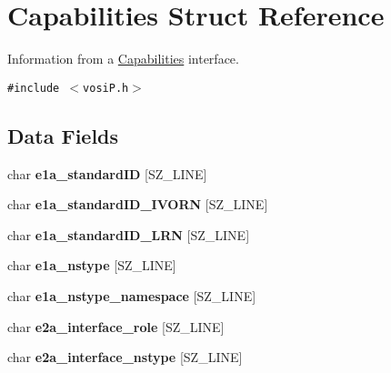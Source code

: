 \hypertarget{structCapabilities}{
\section{Capabilities Struct Reference}
\label{structCapabilities}
}
Information from a \hyperlink{structCapabilities}{Capabilities} interface.  


{\tt \#include $<$vosiP.h$>$}

\subsection*{Data Fields}
\begin{CompactItemize}
\item 
\hypertarget{structCapabilities_8020ae00bdbc48d12754fe04260e7fa1}{
char \textbf{e1a\_\-standardID} \mbox{[}SZ\_\-LINE\mbox{]}}
\label{structCapabilities_8020ae00bdbc48d12754fe04260e7fa1}

\item 
\hypertarget{structCapabilities_ec89e67e6f5cf39ddc6adf814b1dd86e}{
char \textbf{e1a\_\-standardID\_\-IVORN} \mbox{[}SZ\_\-LINE\mbox{]}}
\label{structCapabilities_ec89e67e6f5cf39ddc6adf814b1dd86e}

\item 
\hypertarget{structCapabilities_5908227b2abff053237f980a1f917365}{
char \textbf{e1a\_\-standardID\_\-LRN} \mbox{[}SZ\_\-LINE\mbox{]}}
\label{structCapabilities_5908227b2abff053237f980a1f917365}

\item 
\hypertarget{structCapabilities_1acd1c479ef5855845552039ca8f4a9b}{
char \textbf{e1a\_\-nstype} \mbox{[}SZ\_\-LINE\mbox{]}}
\label{structCapabilities_1acd1c479ef5855845552039ca8f4a9b}

\item 
\hypertarget{structCapabilities_30bd4ccaaf91344f78bb17f35069fe25}{
char \textbf{e1a\_\-nstype\_\-namespace} \mbox{[}SZ\_\-LINE\mbox{]}}
\label{structCapabilities_30bd4ccaaf91344f78bb17f35069fe25}

\item 
\hypertarget{structCapabilities_43765289c66fc7ef70dd662011c38ebe}{
char \textbf{e2a\_\-interface\_\-role} \mbox{[}SZ\_\-LINE\mbox{]}}
\label{structCapabilities_43765289c66fc7ef70dd662011c38ebe}

\item 
\hypertarget{structCapabilities_4c01027f6c327990ad16fb63972c7ecd}{
char \textbf{e2a\_\-interface\_\-nstype} \mbox{[}SZ\_\-LINE\mbox{]}}
\label{structCapabilities_4c01027f6c327990ad16fb63972c7ecd}


\end{CompactItemize}
